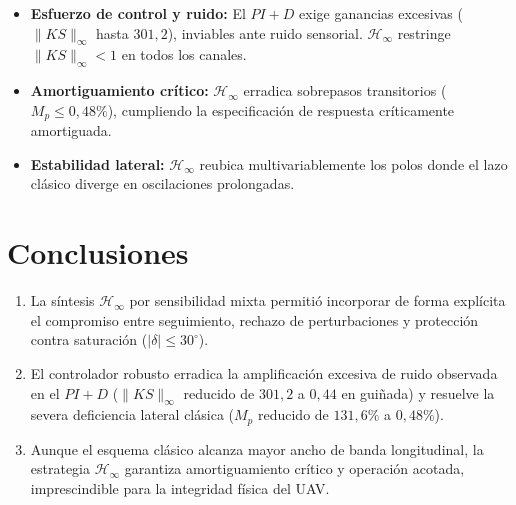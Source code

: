 \documentclass[11pt,letterpaper]{article}
\numberwithin{equation}{section}
\begin{document}
\begin{itemize}[leftmargin=*,noitemsep]
  \item \textbf{Esfuerzo de control y ruido:} El $PI+D$ exige ganancias excesivas ($\|KS\|_\infty$ hasta $301{,}2$), inviables ante ruido sensorial. $\mathcal{H}_\infty$ restringe $\|KS\|_\infty < 1$ en todos los canales.
  \item \textbf{Amortiguamiento cr\'itico:} $\mathcal{H}_\infty$ erradica sobrepasos transitorios ($M_p \leq 0{,}48\%$), cumpliendo la especificaci\'on de respuesta cr\'iticamente amortiguada.
  \item \textbf{Estabilidad lateral:} $\mathcal{H}_\infty$ reubica multivariablemente los polos donde el lazo cl\'asico diverge en oscilaciones prolongadas.
\end{itemize}

\section*{Conclusiones}

\begin{enumerate}[leftmargin=*,noitemsep]
  \item La s\'intesis $\mathcal{H}_\infty$ por sensibilidad mixta permiti\'o incorporar de forma expl\'icita el compromiso entre seguimiento, rechazo de perturbaciones y protecci\'on contra saturaci\'on ($|\delta| \leq 30^\circ$).
  \item El controlador robusto erradica la amplificaci\'on excesiva de ruido observada en el $PI+D$ ($\|KS\|_\infty$ reducido de $301{,}2$ a $0{,}44$ en gui\~nada) y resuelve la severa deficiencia lateral cl\'asica ($M_p$ reducido de $131{,}6\%$ a $0{,}48\%$).
  \item Aunque el esquema cl\'asico alcanza mayor ancho de banda longitudinal, la estrategia $\mathcal{H}_\infty$ garantiza amortiguamiento cr\'itico y operaci\'on acotada, imprescindible para la integridad f\'isica del UAV.
\end{enumerate}
\end{document}

